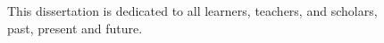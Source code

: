 
\newcommand{\yourDedication}{This dissertation is dedicated to all learners, teachers, and scholars,\\ past, present and future.}

\begin{center}

\vspace*{\fill}
\yourDedication\\
\vspace*{\fill}

\end{center}